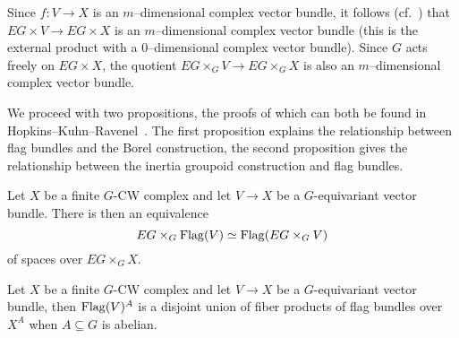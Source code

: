 Since $f \colon V \rightarrow X$ is an $m$--dimensional complex vector bundle, it follows (cf.\ ) that $EG \times V \rightarrow EG \times X$ is an $m$--dimensional complex vector bundle (this is the external product with a $0$--dimensional complex vector bundle). Since $G$ acts freely on $EG \times X$, the quotient $EG \times_G V \rightarrow EG \times_G X$ is also an $m$--dimensional complex vector bundle.

We proceed with two propositions, the proofs of which can both be found in Hopkins--Kuhn--Ravenel~\cite[Proposition 2.6]{HKR}. The first proposition explains the relationship between flag bundles and the Borel construction, the second proposition gives the relationship between the inertia groupoid construction and flag bundles.

\begin{proposition}
Let $X$ be a finite $G$-CW complex and let $V \rightarrow X$ be a $G$-equivariant vector bundle.  There is then an equivalence
\[
EG \times_G \operatorname{Flag}(V) \simeq \operatorname{Flag}(EG \times_G V)
\]
of spaces over $EG \times_G X$.
\end{proposition}

\begin{proposition}
Let $X$ be a finite $G$-CW complex and let $V \rightarrow X$ be a $G$-equivariant vector bundle, then $\operatorname{Flag}(V)^A$ is a disjoint union of fiber products of flag bundles over $X^A$ when $A \subseteq G$ is abelian.
\end{proposition}

